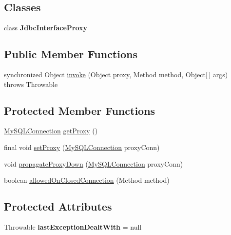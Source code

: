 \subsection*{Classes}
\begin{DoxyCompactItemize}
\item 
class {\bfseries Jdbc\+Interface\+Proxy}
\end{DoxyCompactItemize}
\subsection*{Public Member Functions}
\begin{DoxyCompactItemize}
\item 
synchronized Object \mbox{\hyperlink{classcom_1_1mysql_1_1jdbc_1_1_multi_host_connection_proxy_a9b04a3d31a24703df3ace35e18c02874}{invoke}} (Object proxy, Method method, Object\mbox{[}$\,$\mbox{]} args)  throws Throwable 
\end{DoxyCompactItemize}
\subsection*{Protected Member Functions}
\begin{DoxyCompactItemize}
\item 
\mbox{\hyperlink{interfacecom_1_1mysql_1_1jdbc_1_1_my_s_q_l_connection}{My\+S\+Q\+L\+Connection}} \mbox{\hyperlink{classcom_1_1mysql_1_1jdbc_1_1_multi_host_connection_proxy_ad1a32008ee8fe87595d5f04667f8850e}{get\+Proxy}} ()
\item 
final void \mbox{\hyperlink{classcom_1_1mysql_1_1jdbc_1_1_multi_host_connection_proxy_aac045496f382b249b0fbbdf5d1163813}{set\+Proxy}} (\mbox{\hyperlink{interfacecom_1_1mysql_1_1jdbc_1_1_my_s_q_l_connection}{My\+S\+Q\+L\+Connection}} proxy\+Conn)
\item 
void \mbox{\hyperlink{classcom_1_1mysql_1_1jdbc_1_1_multi_host_connection_proxy_aa6770753b8f86d1d0680e1f97924c64c}{propagate\+Proxy\+Down}} (\mbox{\hyperlink{interfacecom_1_1mysql_1_1jdbc_1_1_my_s_q_l_connection}{My\+S\+Q\+L\+Connection}} proxy\+Conn)
\item 
boolean \mbox{\hyperlink{classcom_1_1mysql_1_1jdbc_1_1_multi_host_connection_proxy_a799290722b93bd37d82f4b1364fa4975}{allowed\+On\+Closed\+Connection}} (Method method)
\end{DoxyCompactItemize}
\subsection*{Protected Attributes}
\begin{DoxyCompactItemize}
\item 
\mbox{\label{classcom_1_1mysql_1_1jdbc_1_1_multi_host_connection_proxy_a08694096ac580335e6cb412254369471}} 
Throwable {\bfseries last\+Exception\+Dealt\+With} = null
\end{DoxyCompactItemize}



